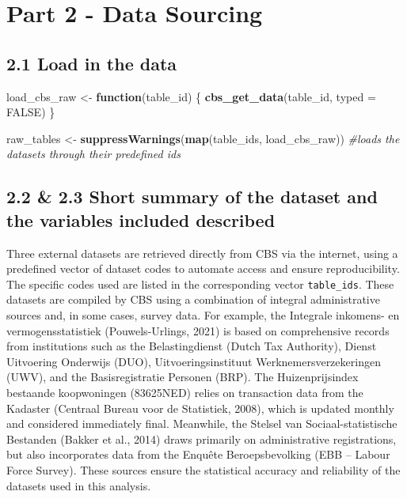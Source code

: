 \documentclass[
]{article}
\newenvironment{Shaded}{\begin{snugshade}}{\end{snugshade}}
\newcommand{\AttributeTok}[1]{\textcolor[rgb]{0.13,0.29,0.53}{#1}}
\newcommand{\CommentTok}[1]{\textcolor[rgb]{0.56,0.35,0.01}{\textit{#1}}}
\newcommand{\ConstantTok}[1]{\textcolor[rgb]{0.56,0.35,0.01}{#1}}
\newcommand{\ControlFlowTok}[1]{\textcolor[rgb]{0.13,0.29,0.53}{\textbf{#1}}}
\newcommand{\FunctionTok}[1]{\textcolor[rgb]{0.13,0.29,0.53}{\textbf{#1}}}
\newcommand{\NormalTok}[1]{#1}
\newcommand{\OtherTok}[1]{\textcolor[rgb]{0.56,0.35,0.01}{#1}}
\begin{document}
\section{Part 2 - Data Sourcing}\label{part-2---data-sourcing}

\subsection{2.1 Load in the data}\label{load-in-the-data}

\begin{Shaded}
\begin{Highlighting}[]
\NormalTok{load\_cbs\_raw }\OtherTok{\textless{}{-}} \ControlFlowTok{function}\NormalTok{(table\_id) \{}
  \FunctionTok{cbs\_get\_data}\NormalTok{(table\_id, }\AttributeTok{typed =} \ConstantTok{FALSE}\NormalTok{)}
\NormalTok{\}}

\NormalTok{raw\_tables }\OtherTok{\textless{}{-}} \FunctionTok{suppressWarnings}\NormalTok{(}\FunctionTok{map}\NormalTok{(table\_ids, load\_cbs\_raw))}
\CommentTok{\#loads the datasets through their predefined ids}
\end{Highlighting}
\end{Shaded}

\subsection{2.2 \& 2.3 Short summary of the dataset and the variables
included
described}\label{short-summary-of-the-dataset-and-the-variables-included-described}

Three external datasets are retrieved directly from CBS via the
internet, using a predefined vector of dataset codes to automate access
and ensure reproducibility. The specific codes used are listed in the
corresponding vector \texttt{table\_ids}. These datasets are compiled by
CBS using a combination of integral administrative sources and, in some
cases, survey data. For example, the Integrale inkomens- en
vermogensstatistiek (Pouwels-Urlings, 2021) is based on comprehensive
records from institutions such as the Belastingdienst (Dutch Tax
Authority), Dienst Uitvoering Onderwijs (DUO), Uitvoeringsinstituut
Werknemersverzekeringen (UWV), and the Basisregistratie Personen (BRP).
The Huizenprijsindex bestaande koopwoningen (83625NED) relies on
transaction data from the Kadaster (Centraal Bureau voor de Statistiek,
2008), which is updated monthly and considered immediately final.
Meanwhile, the Stelsel van Sociaal-statistische Bestanden (Bakker et
al., 2014) draws primarily on administrative registrations, but also
incorporates data from the Enquête Beroepsbevolking (EBB -- Labour Force
Survey). These sources ensure the statistical accuracy and reliability
of the datasets used in this analysis.
\end{document}

